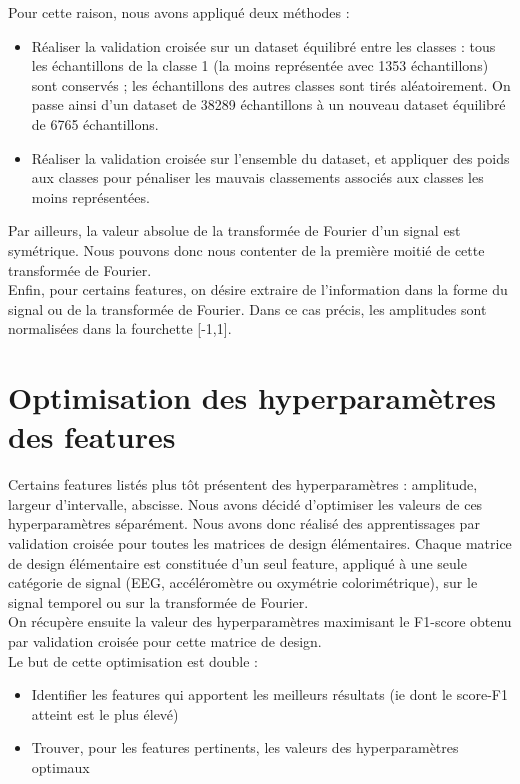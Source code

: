 \documentclass{article}
\begin{document}
Pour cette raison, nous avons appliqué deux méthodes :\\

\begin{itemize}
\item Réaliser la validation croisée sur un dataset équilibré entre les classes : tous les échantillons de la classe 1 (la moins représentée avec 1353 échantillons) sont conservés ; les échantillons des autres classes sont tirés aléatoirement. On passe ainsi d'un dataset de 38289 échantillons à un nouveau dataset équilibré de 6765 échantillons. 
\item Réaliser la validation croisée sur l'ensemble du dataset, et appliquer des poids aux classes pour pénaliser les mauvais classements associés aux classes les moins représentées.
\end{itemize}
\vspace{0.5cm}

Par ailleurs, la valeur absolue de la transformée de Fourier d'un signal est symétrique. Nous pouvons donc nous contenter de la première moitié de cette transformée de Fourier. \\

Enfin, pour certains features, on désire extraire de l'information dans la forme du signal ou de la transformée de Fourier. Dans ce cas précis, les amplitudes sont normalisées dans la fourchette [-1,1].\\

\section{\hspace{0.3cm} Optimisation des hyperparamètres des features}

Certains features listés plus tôt présentent des hyperparamètres : amplitude, largeur d'intervalle, abscisse. Nous avons décidé d'optimiser les valeurs de ces hyperparamètres séparément. Nous avons donc réalisé des apprentissages par validation croisée pour toutes les matrices de design élémentaires. Chaque matrice de design élémentaire est constituée d'un seul feature, appliqué à une seule catégorie de signal (EEG, accéléromètre ou oxymétrie colorimétrique), sur le signal temporel ou sur la transformée de Fourier.\\
On récupère ensuite la valeur des hyperparamètres maximisant le F1-score obtenu par validation croisée pour cette matrice de design.\\

Le but de cette optimisation est double :\\
\begin{itemize}
\item Identifier les features qui apportent les meilleurs résultats (ie dont le score-F1 atteint est le plus élevé)
\item Trouver, pour les features pertinents, les valeurs des hyperparamètres optimaux
\end{itemize}
\vspace{0.5cm}
\end{document}
